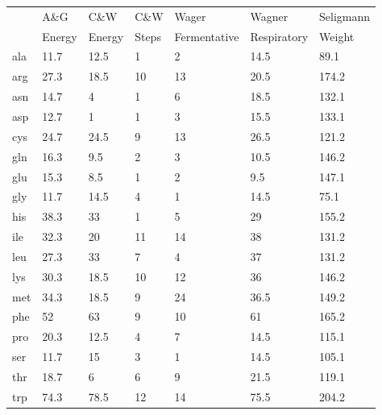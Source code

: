 \begin{table}
\begin{footnotesize}
  \begin{tabular}{ p{1cm} *{6}{p{1.9cm}} }
                                                                                \toprule
          & A\&G   & C\&W   & C\&W  & Wager        & Wagner      & Seligmann \\
          & Energy & Energy & Steps & Fermentative & Respiratory & Weight    \\ \midrule
      ala & 11.7   & 12.5   & 1     & 2            & 14.5        & 89.1      \\
      arg & 27.3   & 18.5   & 10    & 13           & 20.5        & 174.2     \\
      asn & 14.7   & 4      & 1     & 6            & 18.5        & 132.1     \\
      asp & 12.7   & 1      & 1     & 3            & 15.5        & 133.1     \\
      cys & 24.7   & 24.5   & 9     & 13           & 26.5        & 121.2     \\
      gln & 16.3   & 9.5    & 2     & 3            & 10.5        & 146.2     \\
      glu & 15.3   & 8.5    & 1     & 2            & 9.5         & 147.1     \\
      gly & 11.7   & 14.5   & 4     & 1            & 14.5        & 75.1      \\
      his & 38.3   & 33     & 1     & 5            & 29          & 155.2     \\
      ile & 32.3   & 20     & 11    & 14           & 38          & 131.2     \\
      leu & 27.3   & 33     & 7     & 4            & 37          & 131.2     \\
      lys & 30.3   & 18.5   & 10    & 12           & 36          & 146.2     \\
      met & 34.3   & 18.5   & 9     & 24           & 36.5        & 149.2     \\
      phe & 52     & 63     & 9     & 10           & 61          & 165.2     \\
      pro & 20.3   & 12.5   & 4     & 7            & 14.5        & 115.1     \\
      ser & 11.7   & 15     & 3     & 1            & 14.5        & 105.1     \\
      thr & 18.7   & 6      & 6     & 9            & 21.5        & 119.1     \\
      trp & 74.3   & 78.5   & 12    & 14           & 75.5        & 204.2     \\

\end{tabular}
\end{footnotesize}
\end{table}
